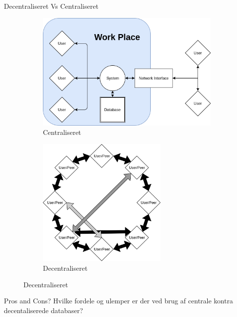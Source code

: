 \documentclass[12pt,t]{beamer}
\begin{document}
\begin{frame}{Decentraliseret Vs Centraliseret}
\begin{figure}
	\centering
	\begin{subfigure}[b]{0.45\textwidth}
		\centering
		\includegraphics[width=1\textwidth]{CS.png}
		\caption{Centraliseret}
	\end{subfigure}
	\begin{subfigure}[b]{0.45\textwidth}
		
		\centering
	\includegraphics[width=0.7\textwidth]{dd.png}
	\caption{Decentraliseret}
	\end{subfigure}
\end{figure}
\begin{block}{Pros and Cons? }
	Hvilke fordele og ulemper er der ved brug af centrale kontra decentaliserede databaser? 
\end{block}
\end{frame}
\end{document}

